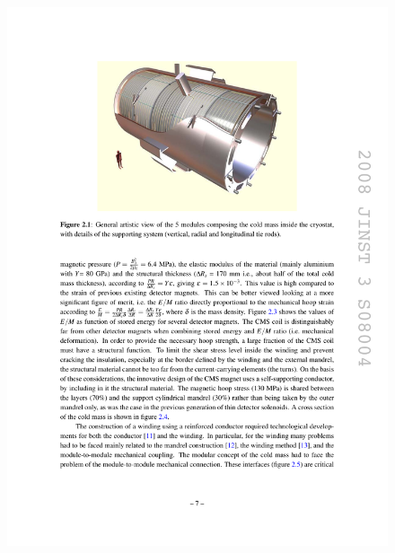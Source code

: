 \begin{figure}[hbtp]
  \begin{center}
    \includegraphics[width=1.24\cmsFigWidth]{figures/cms-magnetcoldmass}

\end{center}
\end{figure}
